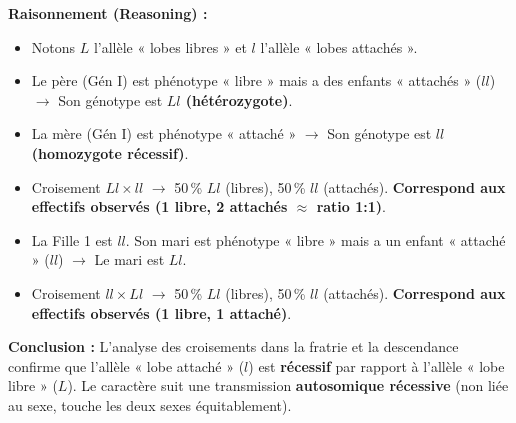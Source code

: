 \documentclass[11pt]{article}
\begin{document}
\begin{exoresolu}
\textbf{Raisonnement (Reasoning) :}
\begin{itemize}
    \item Notons $L$ l'allèle « lobes libres » et $l$ l'allèle « lobes attachés ».
    \item Le père (Gén I) est phénotype « libre » mais a des enfants « attachés » ($ll$) $\rightarrow$ Son génotype est \textbf{$Ll$ (hétérozygote)}.
    \item La mère (Gén I) est phénotype « attaché » $\rightarrow$ Son génotype est \textbf{$ll$ (homozygote récessif)}.
    \item Croisement $Ll \times ll$ $\rightarrow$ 50\,\% $Ll$ (libres), 50\,\% $ll$ (attachés). \textbf{Correspond aux effectifs observés (1 libre, 2 attachés $\approx$ ratio 1:1)}.
    \item La Fille 1 est $ll$. Son mari est phénotype « libre » mais a un enfant « attaché » ($ll$) $\rightarrow$ Le mari est \textbf{$Ll$}.
    \item Croisement $ll \times Ll$ $\rightarrow$ 50\,\% $Ll$ (libres), 50\,\% $ll$ (attachés). \textbf{Correspond aux effectifs observés (1 libre, 1 attaché)}.
\end{itemize}

\textbf{Conclusion :} L'analyse des croisements dans la fratrie et la descendance confirme que l'allèle « lobe attaché » ($l$) est \textbf{récessif} par rapport à l'allèle « lobe libre » ($L$). Le caractère suit une transmission \textbf{autosomique récessive} (non liée au sexe, touche les deux sexes équitablement).
\end{exoresolu}
\end{document}

